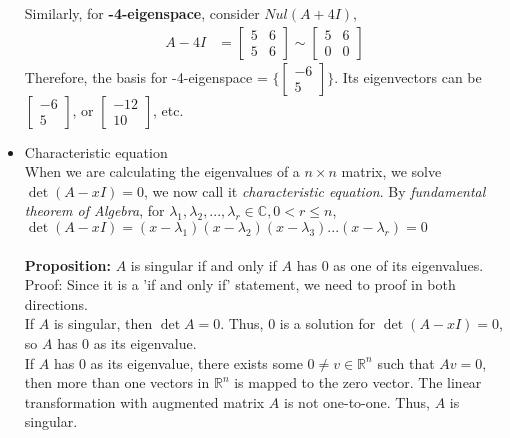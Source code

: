 \documentclass[11pt]{article}
\begin{document}
\begin{itemize}
	Similarly, for \textbf{-4-eigenspace}, consider $Nul(A+4I)$,
	\begin{align*}
	A- 4I &= 
	\begin{bmatrix}
	5& 6\\
	5& 6
	\end{bmatrix} \sim 
	\begin{bmatrix}
	5& 6\\
	0& 0
	\end{bmatrix}
	\end{align*}
	Therefore, the basis for -4-eigenspace = $\{ 
	\begin{bmatrix}
	-6\\
	5
	\end{bmatrix}\}$. Its eigenvectors can be $
	\begin{bmatrix}
	-6\\
	5
	\end{bmatrix}$, or $
	\begin{bmatrix}
	-12\\
	10
	\end{bmatrix}
	$, etc.
	
	\item Characteristic equation\\
	When we are calculating the eigenvalues of a $n\times n$ matrix, we solve $\det(A-xI)=0$, we now call it \textit{characteristic equation}. By \textit{fundamental theorem of Algebra}, for $\lambda _1, \lambda _2, ..., \lambda _r \in \mathbb{C}, 0<r \leqslant n$, $\det(A-x I)= (x- \lambda _1)(x- \lambda _2)(x- \lambda _3)...(x- \lambda _r)=0$\\\\
	\textbf{Proposition:} $A$ is singular if and only if $A$ has $0$ as one of its eigenvalues.\\
	Proof: Since it is a 'if and only if' statement, we need to proof in both directions.\\
	If $A$ is singular, then $\det A = 0$. Thus, $0$ is a solution for $\det(A-xI)=0$, so $A$ has $0$ as its eigenvalue.\\
	If $A$  has $0$ as its eigenvalue, there exists some $0 \neq v \in \mathbb{R}^n$ such that $Av=0$, then more than one vectors in $\mathbb{R}^n$ is mapped to the zero vector. The linear transformation with augmented matrix $A$ is not one-to-one. Thus, $A$ is singular.\\
	

\end{itemize}
\end{document}
